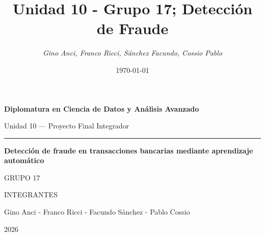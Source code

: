 \documentclass[12pt,a4paper]{{article}}
\title{\color{red}Unidad 10 - Grupo 17; Detección de Fraude}
\author{\itshape Gino Anci, Franco Ricci, Sánchez Facundo, Cossio Pablo}
\date{\small\today}
\begin{document}
    
\begin{titlepage}
    \thispagestyle{empty}
    \sffamily
    \centering

    \vspace*{1.2cm}

    \begin{center}
    \end{center}

    \vfill

    {\large\bfseries Diplomatura en Ciencia de Datos y Análisis Avanzado\par}

    \vspace{0.35cm}

    {\normalsize Unidad 10 --- Proyecto Final Integrador\par}

    \vspace{0.9cm}

    {\color{red}\rule{1.5cm}{1.5pt}\par}

    \vspace{0.9cm}

    {\bfseries\fontsize{21}{28}\selectfont
        Detección de fraude en transacciones bancarias mediante aprendizaje automático\par}

    \vspace{1.8cm}

    {\color{black}\large GRUPO 17\par}

    \vspace*{0.6cm}

    {\small INTEGRANTES\par}

    \vspace{0.35cm}

    {\normalsize
        Gino Anci - Franco Ricci - Facundo Sánchez - Pablo Cossio\par}
    \vfill

    {\small2026\par}

    \vspace*{0.3cm}

    \restoregeometry
\end{titlepage}


    \tableofcontents    








\printbibliography[title={Fuentes y Bibliografía}]
\end{document}
